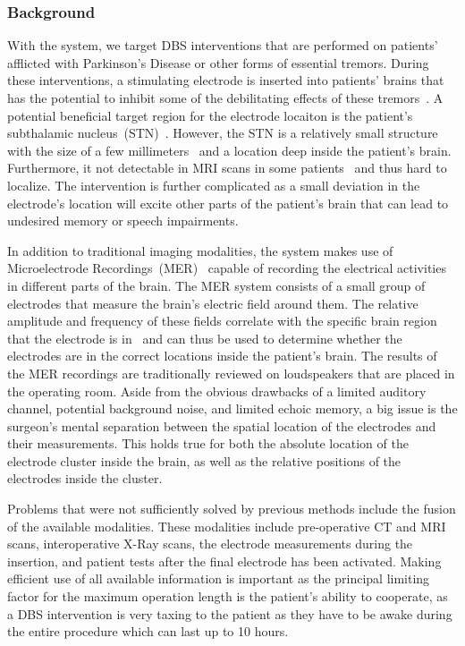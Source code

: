 \subsubsection{Background}
\label{contributions:medbio:dbs:background}
With the system, we target DBS interventions that are performed on patients' afflicted with Parkinson's Disease or other forms of essential tremors. During these interventions, a stimulating electrode is inserted into patients' brains that has the potential to inhibit some of the debilitating effects of these tremors~\cite{Lindberg2002}. A potential beneficial target region for the electrode locaiton is the patient's subthalamic nucleus~(STN)~\cite{Benabid2009}. However, the STN is a relatively small structure with the size of a few millimeters~\cite{Richter2004} and a location deep inside the patient's brain. Furthermore, it not detectable in MRI scans in some patients~\cite{Starr2002} and thus hard to localize. The intervention is further complicated as a small deviation in the electrode's location will excite other parts of the patient's brain that can lead to undesired memory or speech impairments.

In addition to traditional imaging modalities, the system makes use of Microelectrode Recordings~(MER)~\cite{Lenz1988} capable of recording the electrical activities in different parts of the brain. The MER system consists of a small group of electrodes that measure the brain's electric field around them. The relative amplitude and frequency of these fields correlate with the specific brain region that the electrode is in~\cite{benazzouz2002intraoperative} and can thus be used to determine whether the electrodes are in the correct locations inside the patient's brain. The results of the MER recordings are traditionally reviewed on loudspeakers that are placed in the operating room. Aside from the obvious drawbacks of a limited auditory channel, potential background noise, and limited echoic memory, a big issue is the surgeon's mental separation between the spatial location of the electrodes and their measurements. This holds true for both the absolute location of the electrode cluster inside the brain, as well as the relative positions of the electrodes inside the cluster.

Problems that were not sufficiently solved by previous methods include the fusion of the available modalities. These modalities include pre-operative CT and MRI scans, interoperative X-Ray scans, the electrode measurements during the insertion, and patient tests after the final electrode has been activated. Making efficient use of all available information is important as the principal limiting factor for the maximum operation length is the patient's ability to cooperate, as a DBS intervention is very taxing to the patient as they have to be awake during the entire procedure which can last up to 10 hours.

